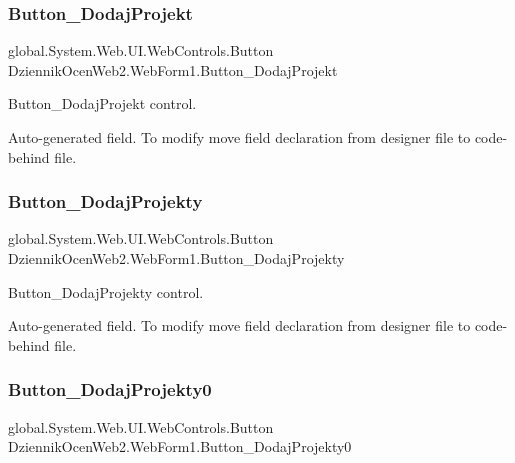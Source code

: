 \subsubsection{\texorpdfstring{Button\+\_\+\+Dodaj\+Projekt}{Button\_DodajProjekt}}
{\footnotesize\ttfamily global.\+System.\+Web.\+U\+I.\+Web\+Controls.\+Button Dziennik\+Ocen\+Web2.\+Web\+Form1.\+Button\+\_\+\+Dodaj\+Projekt\hspace{0.3cm}{\ttfamily [protected]}}



Button\+\_\+\+Dodaj\+Projekt control. 

Auto-\/generated field. To modify move field declaration from designer file to code-\/behind file. \mbox{\label{class_dziennik_ocen_web2_1_1_web_form1_a9ed89f06b0fd85c351236961f0a4a353}} 
\subsubsection{\texorpdfstring{Button\+\_\+\+Dodaj\+Projekty}{Button\_DodajProjekty}}
{\footnotesize\ttfamily global.\+System.\+Web.\+U\+I.\+Web\+Controls.\+Button Dziennik\+Ocen\+Web2.\+Web\+Form1.\+Button\+\_\+\+Dodaj\+Projekty\hspace{0.3cm}{\ttfamily [protected]}}



Button\+\_\+\+Dodaj\+Projekty control. 

Auto-\/generated field. To modify move field declaration from designer file to code-\/behind file. \mbox{\label{class_dziennik_ocen_web2_1_1_web_form1_a116551ad032492cd511786a64b19b21c}} 
\subsubsection{\texorpdfstring{Button\+\_\+\+Dodaj\+Projekty0}{Button\_DodajProjekty0}}
{\footnotesize\ttfamily global.\+System.\+Web.\+U\+I.\+Web\+Controls.\+Button Dziennik\+Ocen\+Web2.\+Web\+Form1.\+Button\+\_\+\+Dodaj\+Projekty0\hspace{0.3cm}{\ttfamily [protected]}}



